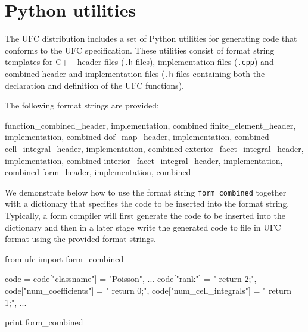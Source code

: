 \chapter{Python utilities}

The UFC distribution includes a set of Python utilities for generating
code that conforms to the UFC specification. These utilities consist
of format string templates for C++ header files (\texttt{.h} files),
implementation files (\texttt{.cpp}) and combined header and
implementation files (\texttt{.h} files containing both the
declaration and definition of the UFC functions).

The following format strings are provided:

\begin{code}
function_combined_{header, implementation, combined}
finite_element_{header, implementation, combined}
dof_map_{header, implementation, combined}
cell_integral_{header, implementation, combined}
exterior_facet_integral_{header, implementation, combined}
interior_facet_integral_{header, implementation, combined}
form_{header, implementation, combined}
\end{code}

We demonstrate below how to use the format string
\texttt{form\_combined} together with a dictionary that specifies the
code to be inserted into the format string. Typically, a form compiler
will first generate the code to be inserted into the dictionary and
then in a later stage write the generated code to file in UFC format
using the provided format strings.

\begin{code}
from ufc import form_combined

code = {}
code["classname"] = "Poisson",
...
code["rank"] = "    return 2;",
code["num_coefficients"] = "    return 0;",
code["num_cell_integrals"] = "    return 1;",
...

print form_combined %
\end{code}
